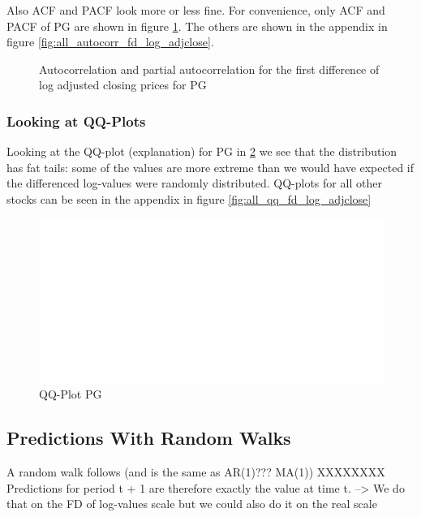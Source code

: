 Also ACF and PACF look more or less fine. For convenience, only ACF and PACF of PG are shown in figure \ref{fig:PG_autocorr_fd_log_adjclose}. The others are shown in the appendix in figure \ref{fig:all_autocorr_fd_log_adjclose}.
\begin{figure}[H]
    \centering
    \begin{adjustbox}{width=.9\textwidth,center}
    
    \end{adjustbox}  
    \caption{Autocorrelation and partial autocorrelation for the first difference of log adjusted closing prices for PG}
    \label{fig:PG_autocorr_fd_log_adjclose}
\end{figure}{}


\subsubsection*{Looking at QQ-Plots}
Looking at the QQ-plot (explanation) for PG in \ref{fig:PG_qq_fd_log_adjclose} we see that the distribution has fat tails: some of the values are more extreme than we would have expected if the differenced log-values were randomly distributed. QQ-plots for all other stocks can be seen in the appendix in figure \ref{fig:all_qq_fd_log_adjclose}

\begin{figure}[h]
    \centering
    \begin{adjustbox}{width=.9\textwidth,center}
    \includegraphics[]{figures/PG_log_adjclose_fd_and_qq.pdf}
    \end{adjustbox}  
    \caption{QQ-Plot PG}
    \label{fig:PG_qq_fd_log_adjclose}
\end{figure}{}







\subsection{Predictions With Random Walks}
A random walk follows (and is the same as AR(1)??? MA(1))
XXXXXXXX
Predictions for period t + 1 are therefore exactly the value at time t. --> We do that on the FD of log-values scale but we could also do it on the real scale

